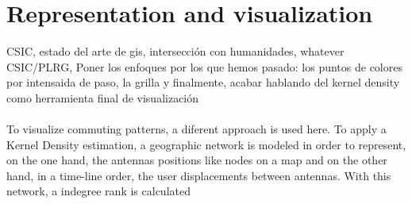 \newpage

\section{Representation and visualization}

 {\color{red} CSIC, estado del arte de gis, intersección con humanidades, whatever}
\\
 {\color{red} CSIC/PLRG, Poner los enfoques por los que hemos pasado: los puntos de colores por intensaida de paso, la grilla y finalmente, acabar hablando del kernel density como herramienta final de visualización} 
 \\
 \\
To visualize commuting patterns, a diferent approach is used here. To apply a Kernel Density estimation, a geographic network is modeled in order to represent, on the one hand, the antennas positions like nodes on a map and on the other hand, in a time-line order, the user displacements between antennas. With this network, a indegree rank is calculated
